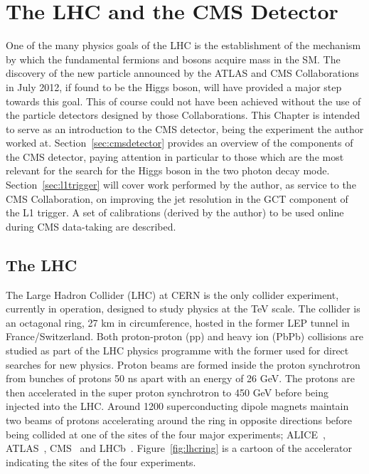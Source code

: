 \chapter{The LHC and the CMS Detector}
\label{chap:detector}

One of the many physics goals of the LHC is the establishment of the mechanism by which 
the fundamental fermions and bosons acquire mass in the SM. The discovery of the new particle 
announced by the ATLAS and CMS Collaborations in July 2012, if found to be the Higgs boson, will have provided 
a major step towards this goal. This of course could not have been achieved without the use
of the particle detectors designed by those Collaborations. This Chapter is intended to serve as an 
introduction to the CMS detector, being the experiment the author worked at. Section~\ref{sec:cmsdetector}
provides an overview of the components of the CMS detector, paying attention in particular to those 
which are the most relevant for the search for the Higgs boson in the two photon decay mode. 
Section~\ref{sec:l1trigger} will cover work performed by the author, as service to the CMS Collaboration, 
on improving the jet resolution in the GCT component of the L1 trigger. A set of calibrations (derived by 
the author) to be used online during CMS data-taking are described.

\section{The LHC}
The Large Hadron Collider (LHC) at CERN is the only collider experiment, currently in operation, 
designed to study physics at the TeV scale. The collider is an octagonal 
ring, 27 km in circumference, hosted in the former LEP tunnel in France/Switzerland.  
Both proton-proton (pp) and heavy ion (PbPb) collisions are
studied as part of the LHC physics programme with the former used 
for direct searches for new physics. Proton beams are formed inside the proton synchrotron
from bunches of protons 50 ns apart with an energy of 26 GeV. The protons are then accelerated in the 
super proton synchrotron to 450 GeV before being injected into the LHC. 
Around 1200 superconducting dipole magnets maintain two beams of protons accelerating around 
the ring in opposite directions before being collided at one of the sites of the four major experiments;
ALICE~\citep{aliceexperiment}, ATLAS~\citep{atlasexperiment}, CMS~\citep{cmsexperiment}
and LHCb~\citep{lhcbexperiment}. Figure~\ref{fig:lhcring} is a cartoon of the accelerator 
indicating the sites of the four experiments.

